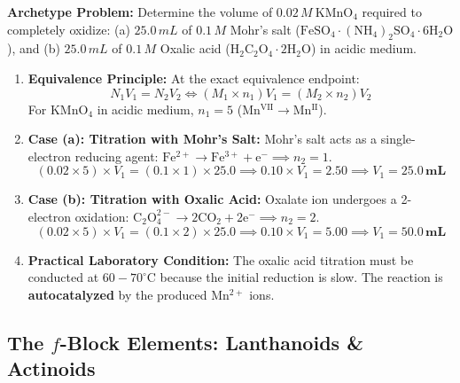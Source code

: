 \documentclass[10pt,a4paper]{article}
\begin{document}
\begin{usecasebox}
\textbf{Archetype Problem:} Determine the volume of $0.02\,\si{M}\ \mathrm{KMnO_4}$ required to completely oxidize:
(a) $25.0\,\si{mL}$ of $0.1\,\si{M}$ Mohr's salt ($\mathrm{FeSO_4\cdot(NH_4)_2SO_4\cdot 6H_2O}$), and
(b) $25.0\,\si{mL}$ of $0.1\,\si{M}$ Oxalic acid ($\mathrm{H_2C_2O_4\cdot 2H_2O}$) in acidic medium.
\begin{enumerate}
  \item \textbf{Equivalence Principle:} At the exact equivalence endpoint:
  \begin{equation*}
    N_1 V_1 = N_2 V_2 \iff (M_1 \times n_1) V_1 = (M_2 \times n_2) V_2
  \end{equation*}
  For $\mathrm{KMnO_4}$ in acidic medium, $n_1 = 5$ ($\mathrm{Mn^{VII} \to Mn^{II}}$).
  \item \textbf{Case (a): Titration with Mohr's Salt:}
  Mohr's salt acts as a single-electron reducing agent: $\mathrm{Fe^{2+} \to Fe^{3+} + e^-} \implies n_2 = 1$.
  \begin{equation*}
    (0.02 \times 5) \times V_1 = (0.1 \times 1) \times 25.0 \implies 0.10 \times V_1 = 2.50 \implies V_1 = \mathbf{25.0\,\si{mL}}
  \end{equation*}
  \item \textbf{Case (b): Titration with Oxalic Acid:}
  Oxalate ion undergoes a 2-electron oxidation: $\mathrm{C_2O_4^{2-} \to 2CO_2 + 2e^-} \implies n_2 = 2$.
  \begin{equation*}
    (0.02 \times 5) \times V_1 = (0.1 \times 2) \times 25.0 \implies 0.10 \times V_1 = 5.00 \implies V_1 = \mathbf{50.0\,\si{mL}}
  \end{equation*}
  \item \textbf{Practical Laboratory Condition:} The oxalic acid titration must be conducted at $60-70^\circ\text{C}$ because the initial reduction is slow. The reaction is \textbf{autocatalyzed} by the produced $\mathrm{Mn^{2+}}$ ions.
\end{enumerate}
\end{usecasebox}

\subsection{The $f$-Block Elements: Lanthanoids \& Actinoids}
\end{document}
